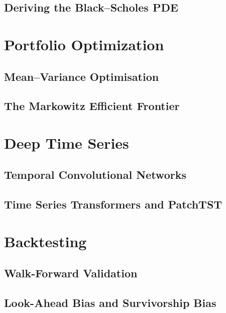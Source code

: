 \subsection{Deriving the Black--Scholes PDE}

\section{Portfolio Optimization}
\label{sec:portfolio-optimization}

\subsection{Mean--Variance Optimisation}

\subsection{The Markowitz Efficient Frontier}

\section{Deep Time Series}
\label{sec:deep-time-series}

\subsection{Temporal Convolutional Networks}

\subsection{Time Series Transformers and PatchTST}

\section{Backtesting}
\label{sec:backtesting}

\subsection{Walk-Forward Validation}

\subsection{Look-Ahead Bias and Survivorship Bias}
